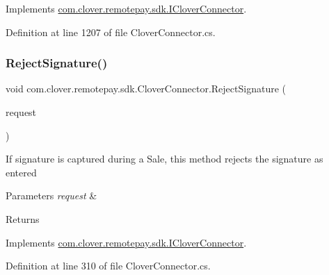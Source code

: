 Implements \hyperlink{interfacecom_1_1clover_1_1remotepay_1_1sdk_1_1_i_clover_connector_a6f4a1ae115140ff1cbc8b6d4a8f46be5}{com.\+clover.\+remotepay.\+sdk.\+I\+Clover\+Connector}.



Definition at line 1207 of file Clover\+Connector.\+cs.

\mbox{\label{classcom_1_1clover_1_1remotepay_1_1sdk_1_1_clover_connector_a8a86e1d3994b81424b06e0846f52dc29}} 
\subsubsection{\texorpdfstring{Reject\+Signature()}{RejectSignature()}}
{\footnotesize\ttfamily void com.\+clover.\+remotepay.\+sdk.\+Clover\+Connector.\+Reject\+Signature (\begin{DoxyParamCaption}\item[{\hyperlink{classcom_1_1clover_1_1remotepay_1_1sdk_1_1_verify_signature_request}{Verify\+Signature\+Request}}]{request }\end{DoxyParamCaption})}



If signature is captured during a Sale, this method rejects the signature as entered 


\begin{DoxyParams}{Parameters}
{\em request} & \\
\hline
\end{DoxyParams}
\begin{DoxyReturn}{Returns}

\end{DoxyReturn}


Implements \hyperlink{interfacecom_1_1clover_1_1remotepay_1_1sdk_1_1_i_clover_connector_a0d7b15309b4113bc8d88c5dd65c351c3}{com.\+clover.\+remotepay.\+sdk.\+I\+Clover\+Connector}.



Definition at line 310 of file Clover\+Connector.\+cs.

\mbox{\label{classcom_1_1clover_1_1remotepay_1_1sdk_1_1_clover_connector_a05aa30b8a934164519333645e267c2e5}} 
